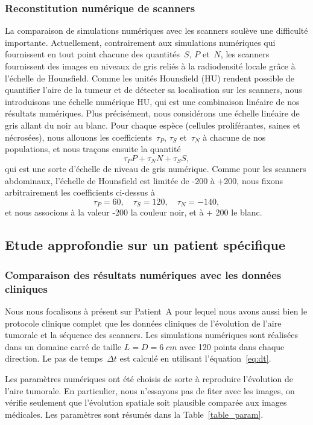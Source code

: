 \documentclass[11pt]{amsart}
\numberwithin{equation}{section}
\newcommand{\Nber}{Patient~A\xspace}
\begin{document}
\subsubsection{Reconstitution numérique de scanners}

La comparaison de simulations numériques 
avec les scanners soulève une difficulté importante. 
Actuellement, contrairement aux simulations numériques qui fournissent en tout point chacune des quantités~$S$, $P$ et~$N$, les scanners fournissent des images en niveaux de gris reliés à la radiodensité locale grâce à l'échelle de 
Hounsfield. Comme les unités Hounsfield (HU) rendent possible de quantifier 
l'aire de la tumeur et de détecter sa localisation sur les scanners, nous introduisons une échelle numérique HU, qui est une combinaison linéaire de nos résultats numériques. 
Plus précisément, nous considérons une échelle linéaire de gris allant du noir au blanc. Pour chaque espèce (cellules proliférantes, saines et nécrosées), nous allouons les 
coefficients~$\tau_P$, $\tau_S$ et~$\tau_N$ à chacune de nos populations, et nous traçons ensuite la quantité
\begin{equation}\label{eq:grey_level}
\tau_P P + \tau_N N + \tau_S S,
\end{equation}
qui est une sorte d'échelle de niveau de gris numérique.
Comme pour les scanners abdominaux, l'échelle de Hounsfield est limitée de 
-200 à +200, nous fixons arbitrairement les coefficients ci-dessus à 
$$\tau_P=60,\quad \tau_S=120,\quad \tau_N=-140,$$
et nous associons à la valeur -200 la couleur noir, et à + 200 le blanc.


\subsection{Etude approfondie sur un patient spécifique}
\subsubsection{Comparaison des résultats numériques avec les données cliniques}
Nous nous focalisons à présent sur \Nber pour lequel nous avons aussi bien le protocole clinique complet que les données cliniques de l'évolution de l'aire tumorale et la séquence des scanners. 
Les simulations numériques sont réalisées dans un domaine carré de taille 
$L=D=6\;cm$ avec 120 points dans chaque direction. 
Le pas de temps~$\Delta t$ est calculé en utilisant l'équation~\eqref{eq:dt}. 


Les paramètres numériques ont été choisis de sorte à reproduire l'évolution de l'aire tumorale. En particulier, nous n'essayons pas de fiter avec les images, on vérifie seulement que l'évolution spatiale soit plausible comparée aux images médicales. Les paramètres sont résumés dans la Table~\ref{table_param}.
\end{document}
